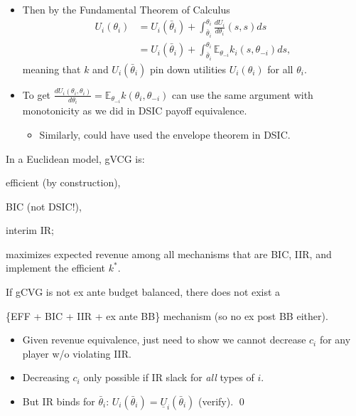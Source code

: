 \documentclass[english]{beamer}		%
\def\lyxframeend{} %
\begin{document}
\begin{itemize}
	\item Then by the Fundamental Theorem of Calculus
	\begin{align*}
		U_i (\theta_i) &= U_i (\bar{\theta}_i) + \int_{\bar{\theta}_i}^{\theta_i} \frac{d U_i}{d \theta_i}(s,s) d s
		\\&= U_i (\bar{\theta}_i) + \int_{\bar{\theta}_i}^{\theta_i} \mathbb{E}_{\theta_{-i}} k_i(s,\theta_{-i}) d s,
	\end{align*}
	meaning that $k$ and $U_i (\bar{\theta}_i)$ pin down utilities $U_i (\theta_i)$ for all $\theta_i$.
	\item To get $\frac{d U_i (\theta_i,\theta_{i})}{d \theta_i} = \mathbb{E}_{\theta_{-i}} k(\theta_i,\theta_{-i})$ can use the same argument with monotonicity as we did in DSIC payoff equivalence.
	\begin{itemize}
		\item Similarly, could have used the envelope theorem in DSIC.
	\end{itemize}
\end{itemize}
\lyxframeend


\begin{theorem}
	In a \alert{Euclidean} model, gVCG is:
	\begin{itemize}{\color{gray}
		\item efficient (by construction),
		\item BIC (not DSIC!),
		\item interim IR;}
		\item maximizes expected revenue among all mechanisms that are BIC, IIR, and implement the efficient $k^*$.
	\end{itemize}
\end{theorem}
If gCVG is not ex ante budget balanced, there does not exist a 

\{EFF + BIC + IIR + ex ante BB\} mechanism (so no ex post BB either).
\lyxframeend


\begin{itemize}
	\item Given revenue equivalence, just need to show we cannot decrease $c_i$ for any player w/o violating IIR.
	\pause
	\item Decreasing $c_i$ only possible if IR slack for \emph{all} types of $i$.
	\pause
	\item But IR binds for $\bar{\theta}_i$: $U_i (\bar{\theta}_i) = \underline{U}_i (\bar{\theta}_i)$ (verify). \qed
\end{itemize}
\lyxframeend
\end{document}

